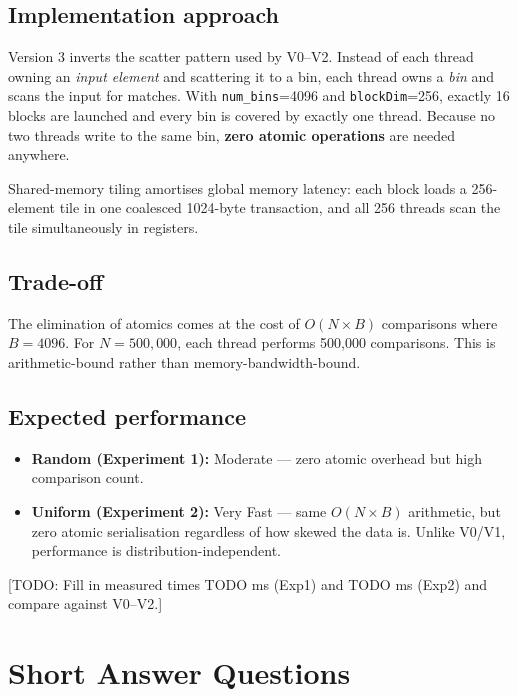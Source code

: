 \documentclass[11pt, letterpaper]{article}
\newcommand{\EOneVThreeAvg}{TODO}
\newcommand{\ETwoVThreeAvg}{TODO}
\begin{document}
\subsection*{Implementation approach}

Version 3 inverts the scatter pattern used by V0--V2.
Instead of each thread owning an \emph{input element} and scattering it
to a bin, each thread owns a \emph{bin} and scans the input for matches.
With \texttt{num\_bins}=4096 and \texttt{blockDim}=256, exactly 16 blocks
are launched and every bin is covered by exactly one thread.
Because no two threads write to the same bin, \textbf{zero atomic
operations} are needed anywhere.

Shared-memory tiling amortises global memory latency: each block loads a
256-element tile in one coalesced 1024-byte transaction, and all 256 threads
scan the tile simultaneously in registers.

\subsection*{Trade-off}

The elimination of atomics comes at the cost of $O(N \times B)$ comparisons
where $B = 4096$.  For $N = 500{,}000$, each thread performs 500{,}000
comparisons.  This is arithmetic-bound rather than memory-bandwidth-bound.

\subsection*{Expected performance}

\begin{itemize}[noitemsep]
  \item \textbf{Random (Experiment 1):} Moderate — zero atomic overhead
        but high comparison count.
  \item \textbf{Uniform (Experiment 2):} Very Fast — same $O(N \times B)$
        arithmetic, but zero atomic serialisation regardless of how skewed
        the data is.  Unlike V0/V1, performance is distribution-independent.
\end{itemize}

[TODO: Fill in measured times \EOneVThreeAvg{} ms (Exp1)
and \ETwoVThreeAvg{} ms (Exp2) and compare against V0--V2.]

\section{Short Answer Questions}
\end{document}
